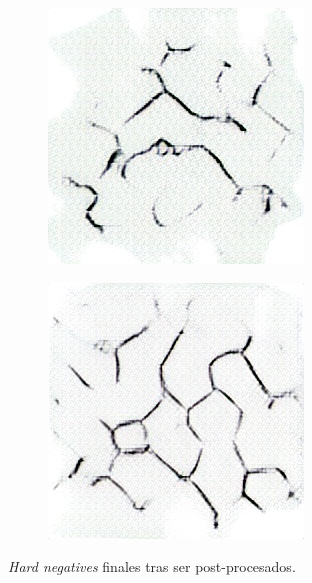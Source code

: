 \begin{figure}[H]
    \bigskip

    \begin{subfigure}{.28\textwidth}
        \centering
        \includegraphics[width=1\linewidth]{imagenes/image_generation/clean_results/perlin_e80_a1_f2_13.jpg}
    \end{subfigure}%
    \begin{subfigure}{.28\textwidth}
        \centering
        \includegraphics[width=1\linewidth]{imagenes/image_generation/clean_results/perlin_e85_a7_f2_42.jpg}
    \end{subfigure}

    \caption{\textit{Hard negatives} finales tras ser post-procesados.}
    \label{fig:hard-negatives}
\end{figure}

